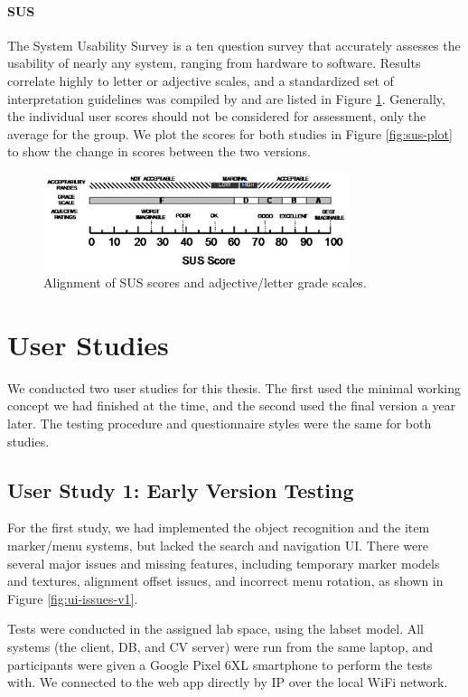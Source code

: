 \documentclass[thesis]{fputhesis}
\begin{document}
\begin{body}
\subsubsection{SUS}
The System Usability Survey is a ten question survey that accurately assesses the usability of nearly any system, ranging from hardware to software. Results correlate highly to letter or adjective scales, and a standardized set of interpretation guidelines was compiled by \cite{brooke_sus_1996} and are listed in Figure \ref{fig:sus-table}. Generally, the individual user scores should not be considered for assessment, only the average for the group. We plot the scores for both studies in Figure \ref{fig:sus-plot} to show the change in scores between the two versions.

\begin{figure}[h]
    \centering
    \includegraphics[width=0.8\textwidth]{Images/sus-table.jpg}
    \caption{Alignment of SUS scores and adjective/letter grade scales.}
    \label{fig:sus-table}
\end{figure}

\chapter{User Studies}
We conducted two user studies for this thesis. The first used the minimal working concept we had finished at the time, and the second used the final version a year later. The testing procedure and questionnaire styles were the same for both studies.
\section{User Study 1: Early Version Testing}
For the first study, we had implemented the object recognition and the item marker/menu systems, but lacked the search and navigation UI. There were several major issues and missing features, including temporary marker models and textures, alignment offset issues, and incorrect menu rotation, as shown in Figure \ref{fig:ui-issues-v1}.

Tests were conducted in the assigned lab space, using the labset model. All systems (the client, DB, and CV server) were run from the same laptop, and participants were given a Google Pixel 6XL smartphone to perform the tests with. We connected to the web app directly by IP over the local WiFi network.

\end{body}
\end{document}
